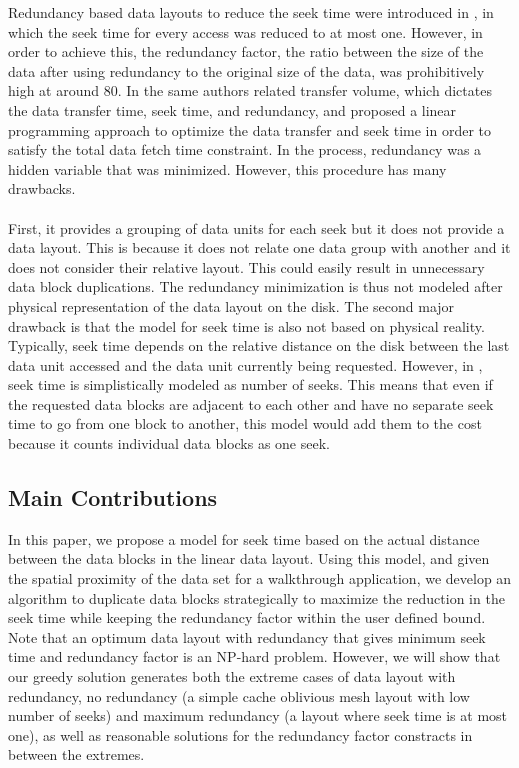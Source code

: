 \documentclass[conference]{acmsiggraph}
\begin{document}
Redundancy based data layouts to reduce the seek time were introduced in \cite{singleseeklayout}, in which the seek time for every access was reduced to at most one. However, in order to achieve this, the redundancy factor, the ratio between the size of the data after using redundancy to the original size of the data, was prohibitively high at around 80. In \cite{optimizingredundancy} the same authors related transfer volume, which dictates the data transfer time, seek time, and redundancy, and proposed a linear programming approach to optimize the data transfer and seek time in order to satisfy the total data fetch time constraint. In the process, redundancy was a hidden variable that was minimized. However, this procedure has many drawbacks.\\
\\
First, it provides a grouping of data units for each seek but it does not provide a data layout. This is because it does not relate one data group with another and it does not consider their relative layout. This could easily result in unnecessary data block duplications. The redundancy minimization is thus not modeled after physical representation of the data layout on the disk. The second major drawback is that the model for seek time is also not based on physical reality. Typically, seek time depends on the relative distance on the disk between the last data unit accessed and the data unit currently being requested. However, in \cite{optimizingredundancy}, seek time is simplistically modeled as number of seeks. This means that even if the requested data blocks are adjacent to each other and have no separate seek time to go from one block to another, this model would add them to the cost because it counts individual data blocks as one seek. 

\subsection{Main Contributions}

In this paper, we propose a model for seek time based on the actual distance between the data blocks in the linear data layout. Using this model, and given the spatial proximity of the data set for a walkthrough application, we develop an algorithm to duplicate data blocks strategically to maximize the reduction in the seek time while keeping the redundancy factor within the user defined bound. Note that an optimum data layout with redundancy that gives minimum seek time and redundancy factor is an NP-hard problem. However, we will show that our greedy solution generates both the extreme cases of data layout with redundancy, no redundancy (a simple cache oblivious mesh layout with low number of seeks) and maximum redundancy (a layout where seek time is at most one), as well as reasonable solutions for the redundancy factor constracts in between the extremes.
\end{document}
